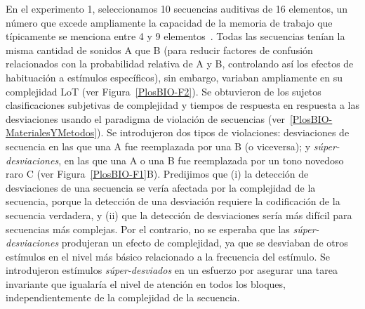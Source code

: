 
En el experimento 1, seleccionamos 10 secuencias auditivas de 16 elementos, un número que excede ampliamente la capacidad de la memoria de trabajo que típicamente se menciona entre 4 y 9 elementos~\cite{f25,f29,f86}. Todas las secuencias tenían la misma cantidad de sonidos A que B (para reducir factores de confusión relacionados con la probabilidad relativa de A y B, controlando así los efectos de habituación a estímulos específicos), sin embargo, variaban ampliamente en su complejidad LoT (ver Figura~\ref{PlosBIO-F2}). Se obtuvieron de los sujetos clasificaciones subjetivas de complejidad y tiempos de respuesta en respuesta a las desviaciones usando el paradigma de violación de secuencias (ver~\ref{PlosBIO-MaterialesYMetodos}). Se introdujeron dos tipos de violaciones: desviaciones de secuencia en las que una A fue reemplazada por una B (o viceversa); y \textit{súper-desviaciones}, en las que una A o una B fue reemplazada por un tono novedoso raro C (ver Figura~\ref{PlosBIO-F1}B). Predijimos que (i) la detección de desviaciones de una secuencia se vería afectada por la complejidad de la secuencia, porque la detección de una desviación requiere la codificación de la secuencia verdadera, y (ii) que la detección de desviaciones sería más difícil para secuencias más complejas. Por el contrario, no se esperaba que las \textit{súper-desviaciones} produjeran un efecto de complejidad, ya que se desviaban de otros estímulos en el nivel más básico relacionado a la frecuencia del estímulo. Se introdujeron estímulos \textit{súper-desviados} en un esfuerzo por asegurar una tarea invariante que igualaría el nivel de atención en todos los bloques, independientemente de la complejidad de la secuencia. 


